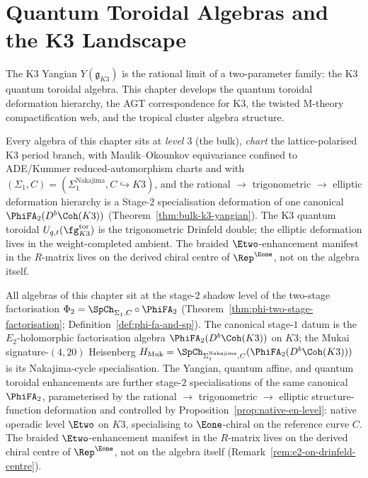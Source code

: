 \chapter{Quantum Toroidal Algebras and the K3 Landscape}
\label{ch:k3-quantum-toroidal}

The K3 Yangian $Y(\mathfrak{g}_{K3})$ is the rational limit of a
two-parameter family: the K3 quantum toroidal algebra. This chapter
develops the quantum toroidal deformation hierarchy, the AGT
correspondence for K3, the twisted M-theory compactification web, and
the tropical cluster algebra structure.

\begin{remark}
\label{rem:k3-quantum-toroidal-three-axis-coords}
Every algebra of this chapter sits at \emph{level $3$} (the bulk),
\emph{chart} the lattice-polarised K3 period branch, with
Maulik--Okounkov equivariance confined to ADE/Kummer reduced-automorphism
charts and with $(\Sigma_1, C) = (\Sigma_1^{\mathrm{Nakajima}}, C \hookrightarrow K3)$,
and the rational $\to$ trigonometric $\to$ elliptic deformation
hierarchy is a Stage-$2$ specialisation deformation of one canonical
$\PhiFA_2(D^b\Coh(K3))$ (Theorem~\ref{thm:bulk-k3-yangian}).
The K3 quantum toroidal $U_{q,t}(\fg_{K3}^{\mathrm{tor}})$ is the
trigonometric Drinfeld double; the elliptic deformation lives in the
weight-completed ambient. The braided $\Etwo$-enhancement manifest in
the $R$-matrix lives on the derived chiral centre of $\Rep^{\Eone}$,
not on the algebra itself.
\end{remark}

All algebras of this chapter sit at the stage-$2$ shadow level of the
two-stage factorisation $\Phi_2 = \SpCh_{\Sigma_1, C} \circ \PhiFA_2$
(Theorem~\ref{thm:phi-two-stage-factorisation};
Definition~\ref{def:phi-fa-and-sp}). The canonical stage-$1$ datum is
the $E_2$-holomorphic factorisation algebra $\PhiFA_2(D^b\Coh(K3))$ on
$K3$; the Mukai signature-$(4, 20)$ Heisenberg $H_{\mathrm{Muk}} =
\SpCh_{\Sigma_1^{\mathrm{Nakajima}}, C}(\PhiFA_2(D^b\Coh(K3)))$ is its
Nakajima-cycle specialisation. The Yangian, quantum affine, and quantum
toroidal enhancements are further stage-$2$ specialisations of the same
canonical $\PhiFA_2$, parameterised by the rational $\to$ trigonometric
$\to$ elliptic structure-function deformation and controlled by
Proposition~\ref{prop:native-en-level}: native operadic level $\Etwo$
on $K3$, specialising to $\Eone$-chiral on the reference curve $C$. The
braided $\Etwo$-enhancement manifest in the $R$-matrix lives on the
derived chiral centre of $\Rep^{\Eone}$, not on the algebra itself
(Remark~\ref{rem:e2-on-drinfeld-centre}).

